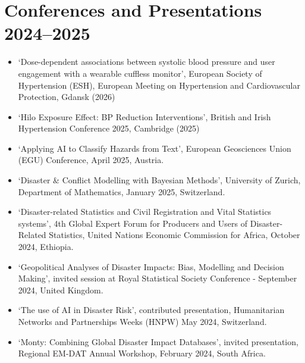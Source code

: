 \documentclass[a4paper,10pt]{article}
\begin{document}
\section*{Conferences and Presentations 2024--2025}
\begin{itemize}[leftmargin=*,noitemsep]
  \item `Dose-dependent associations between systolic blood pressure and user engagement with a wearable cuffless monitor', European Society of Hypertension (ESH), European Meeting on Hypertension and Cardiovascular Protection, Gdansk (2026)
  \item `Hilo Exposure Effect: BP Reduction Interventions', British and Irish Hypertension Conference 2025, Cambridge (2025)
  \item `Applying AI to Classify Hazards from Text', European Geosciences Union (EGU) Conference, April 2025, Austria.
  \item `Disaster \& Conflict Modelling with Bayesian Methods', University of Zurich, Department of Mathematics, January 2025, Switzerland.
  \item `Disaster-related Statistics and Civil Registration and Vital Statistics systems', 4th Global Expert Forum for Producers and Users of Disaster-Related Statistics, United Nations Economic Commission for Africa, October 2024, Ethiopia.
  \item `Geopolitical Analyses of Disaster Impacts: Bias, Modelling and Decision Making', invited session at Royal Statistical Society Conference - September 2024, United Kingdom.
  \item `The use of AI in Disaster Risk', contributed presentation, Humanitarian Networks and Partnerships Weeks (HNPW) May 2024, Switzerland.
  \item `Monty: Combining Global Disaster Impact Databases', invited presentation, Regional EM-DAT Annual Workshop, February 2024, South Africa.
\end{itemize}

\end{document}
